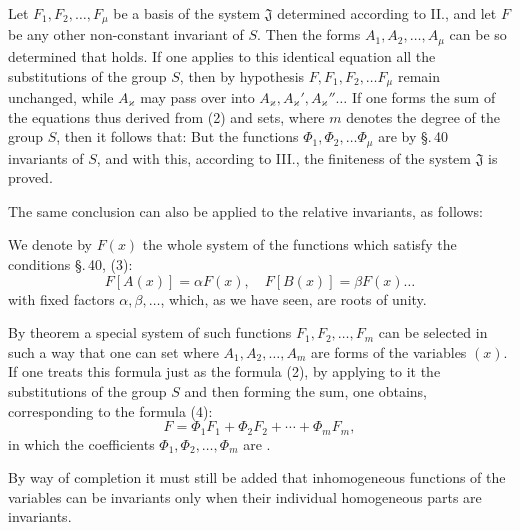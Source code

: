 Let $F_1, F_2, \ldots, F_\mu$ be a basis of the system $\mathfrak{J}$ determined according to II., and let $F$ be any other non-constant invariant of $S$. Then the forms $A_1, A_2, \ldots, A_\mu$ can be so determined that
holds. If one applies to this identical equation all the substitutions of the group $S$, then by hypothesis $F, F_1, F_2, \ldots F_\mu$ remain unchanged, while $A_\varkappa$ may pass over into $A_\varkappa, A_\varkappa', A_\varkappa'' \ldots$ If one forms the sum of the equations thus derived from (2) and sets, where $m$ denotes the degree of the group $S$,
then it follows that:
But the functions $\Phi_1, \Phi_2, \ldots \Phi_\mu$ are by \S.\,40 invariants of $S$, and with this, according to III., the finiteness of the system $\mathfrak{J}$ is proved.

The same conclusion can also be applied to the relative invariants, as follows:

We denote by $F(x)$ the whole system of the functions which satisfy the conditions \S.\,40, (3):
\[
F[A(x)] = \alpha F(x), \quad F[B(x)] = \beta F(x) \ldots
\]
with fixed factors $\alpha, \beta, \ldots$, which, as we have seen, are roots of unity.

By  theorem a special system of such functions $F_1, F_2, \ldots, F_m$ can be selected in such a way that one can set
where $A_1, A_2, \ldots, A_m$ are forms of the variables $(x)$. If one treats this formula just as the formula (2), by applying to it the substitutions of the group $S$ and then forming the sum, one obtains, corresponding to the formula (4):
\[
F = \Phi_1F_1 + \Phi_2F_2 + \cdots + \Phi_mF_m,
\]
in which the coefficients $\Phi_1, \Phi_2, \ldots, \Phi_m$ are .

By way of completion it must still be added that inhomogeneous functions of the variables can be invariants only when their individual homogeneous parts are invariants.
